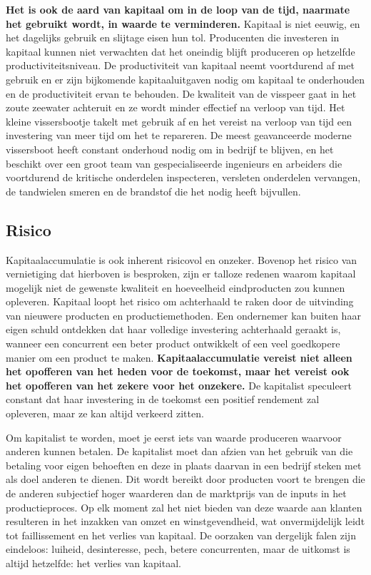 \textbf{Het is ook de aard van kapitaal om in de loop van de tijd, naarmate het gebruikt wordt, in waarde te verminderen.} Kapitaal is niet eeuwig, en het dagelijks gebruik en slijtage eisen hun tol. Producenten die investeren in kapitaal kunnen niet verwachten dat het oneindig blijft produceren op hetzelfde productiviteitsniveau. De productiviteit van kapitaal neemt voortdurend af met gebruik en er zijn bijkomende kapitaaluitgaven nodig om kapitaal te onderhouden en de productiviteit ervan te behouden. De kwaliteit van de visspeer gaat in het zoute zeewater achteruit en ze wordt minder effectief na verloop van tijd. Het kleine vissersbootje takelt met gebruik af en het vereist na verloop van tijd een investering van meer tijd om het te repareren. De meest geavanceerde moderne vissersboot heeft constant onderhoud nodig om in bedrijf te blijven, en het beschikt over een groot team van gespecialiseerde ingenieurs en arbeiders die voortdurend de kritische onderdelen inspecteren, versleten onderdelen vervangen, de tandwielen smeren en de brandstof die het nodig heeft bijvullen.

\subsection{Risico}

Kapitaalaccumulatie is ook inherent risicovol en onzeker. Bovenop het risico van vernietiging dat hierboven is besproken, zijn er talloze redenen waarom kapitaal mogelijk niet de gewenste kwaliteit en hoeveelheid eindproducten zou kunnen opleveren. Kapitaal loopt het risico om achterhaald te raken door de uitvinding van nieuwere producten en productiemethoden. Een ondernemer kan buiten haar eigen schuld ontdekken dat haar volledige investering achterhaald geraakt is, wanneer een concurrent een beter product ontwikkelt of een veel goedkopere manier om een product te maken. \textbf{Kapitaalaccumulatie vereist niet alleen het opofferen van het heden voor de toekomst, maar het vereist ook het opofferen van het zekere voor het onzekere.} De kapitalist speculeert constant dat haar investering in de toekomst een positief rendement zal opleveren, maar ze kan altijd verkeerd zitten.

Om kapitalist te worden, moet je eerst iets van waarde produceren waarvoor anderen kunnen betalen. De kapitalist moet dan afzien van het gebruik van die betaling voor eigen behoeften en deze in plaats daarvan in een bedrijf steken met als doel anderen te dienen. Dit wordt bereikt door producten voort te brengen die de anderen subjectief hoger waarderen dan de marktprijs van de inputs in het productieproces. Op elk moment zal het niet bieden van deze waarde aan klanten resulteren in het inzakken van omzet en winstgevendheid, wat onvermijdelijk leidt tot faillissement en het verlies van kapitaal. De oorzaken van dergelijk falen zijn eindeloos: luiheid, desinteresse, pech, betere concurrenten, maar de uitkomst is altijd hetzelfde: het verlies van kapitaal.

